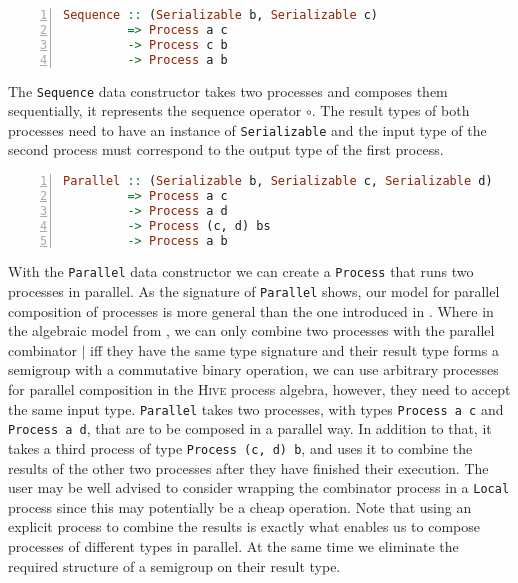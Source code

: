 \begin{lstlisting}[language=Haskell,caption=Signature of the \texttt{Seqeuence} type constructor.,numbers=left,frame=bt]
Sequence :: (Serializable b, Serializable c)
         => Process a c
         -> Process c b
         -> Process a b
\end{lstlisting}
The \texttt{Sequence} data constructor takes two processes and composes them sequentially, it represents the sequence operator $\circ$. The result types of both processes need to have an instance of \texttt{Serializable} and the input type of the second process must correspond to the output type of the first process.

\begin{lstlisting}[language=Haskell,caption=Signature of the \texttt{Parallel} type constructor.,numbers=left,frame=bt]
Parallel :: (Serializable b, Serializable c, Serializable d)
         => Process a c
         -> Process a d
         -> Process (c, d) bs
         -> Process a b
\end{lstlisting}
With the \texttt{Parallel} data constructor we can create a \texttt{Process} that runs two processes in parallel. As the signature of \texttt{Parallel} shows, our model for parallel composition of processes is more general than the one introduced in . Where in the algebraic model from , we can only combine two processes with the parallel combinator $|$ iff they have the same type signature and their result type forms a semigroup with a commutative binary operation, we can use arbitrary processes for parallel composition in the \textsc{Hive} process algebra, however, they need to accept the same input type. \texttt{Parallel} takes two processes, with types \texttt{Process a c} and \texttt{Process a d}, that are to be composed in a parallel way. In addition to that, it takes a third process of type \texttt{Process (c, d) b}, and uses it to combine the results of the other two processes after they have finished their execution. The user may be well advised to consider wrapping the combinator process in a \texttt{Local} process since this may potentially be a cheap operation. Note that using an explicit process to combine the results is exactly what enables us to compose processes of different types in parallel. At the same time we eliminate the required structure of a semigroup on their result type.


